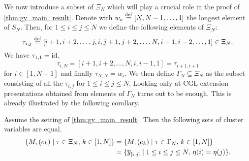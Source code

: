 We now introduce a subset of $\Xi_N$ which will play a crucial role in the proof of
\cref{thm:gy_main_result}. Denote with $w_\circ \overset{\mathrm{def}}{=} [N, N-1, \dots, 1]$ the longest element of $S_N$. Then, for $1 \leq i \leq j \leq N$ we
define the following elements of $\Xi_N$:
\begin{equation*}
	\tau_{i,j} \overset{\mathrm{def}}{=} [i+1, i+2, \dots, j, i ,j+1, j+2, \dots, N, i-1,i-2, \dots, 1] \in \Xi_N.
\end{equation*}
%
%
We have $\tau_{1,1} = \operatorname{id}$,
\begin{equation*}
	\tau_{i, N} = [i+1, i+2, \dots, N, i, i-1, 1] = \tau_{i+1, i+1}
\end{equation*}
%
for $i \in [1, N-1]$ and finally $\tau_{N, N} = w_\circ$. We then define $\Gamma_N
	\subseteq \Xi_N$ as the subset consisting of all the
$\tau_{i,j}$ for $1 \leq i \leq j \leq N$. Looking only at CGL extension presentations
obtained from elements of $\Gamma_N$ turns out to be enough. This is already
illustrated by the following corollary.
\begin{corollary}
	Assume the setting of \cref{thm:gy_main_result}. Then the following sets of cluster variables are equal.
	\begin{align*}
		\{M_\tau(e_k) \mid \tau \in \Xi_N,\, k \in [1, N]\}
		 & = \{M_\tau(e_k) \mid \tau \in \Gamma_N,\, k \in [1, N]\}             \\
		 & = \{\overline{y}_{[i,j]} \mid 1 \leq i \leq j \leq N, \, \eta(i) = \eta(j)\}.
	\end{align*}
\end{corollary}
